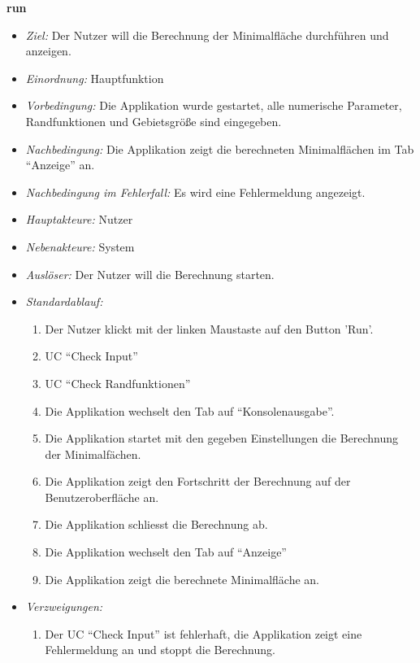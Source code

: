 \textbf{run}
  \begin{itemize}
  \item \textit{Ziel:} Der Nutzer will die Berechnung der Minimalfl\"ache durchf\"uhren und anzeigen.
  \item \textit{Einordnung:} Hauptfunktion
  \item \textit{Vorbedingung:} Die Applikation wurde gestartet, alle numerische Parameter, Randfunktionen und Gebietsgr\"o\ss e sind eingegeben.
  \item \textit{Nachbedingung:} Die Applikation zeigt die berechneten Minimalfl\"achen im Tab "`Anzeige"' an.
    \item \textit{Nachbedingung im Fehlerfall:} Es wird eine Fehlermeldung angezeigt.
  \item \textit{Hauptakteure:} Nutzer
  \item \textit{Nebenakteure:} System
  \item \textit{Ausl\"oser:} Der Nutzer will die Berechnung starten.
    \item \textit{Standardablauf:}
    \begin{enumerate}
    \item Der Nutzer klickt mit der linken Maustaste auf den Button 'Run'.
    \item UC "`Check Input"'
    \item UC "`Check Randfunktionen"'
    \item Die Applikation wechselt den Tab auf "`Konsolenausgabe"'.
    \item Die Applikation startet mit den gegeben Einstellungen die Berechnung der Minimalf\"achen.
    \item Die Applikation zeigt den Fortschritt der Berechnung auf der Benutzeroberfl\"ache an.
    \item Die Applikation schliesst die Berechnung ab.
    \item Die Applikation wechselt den Tab auf "`Anzeige"'
    \item Die Applikation zeigt die berechnete Minimalfl\"ache an.
  \end{enumerate}
  \item \textit{Verzweigungen:}
      \begin{enumerate}[label=(2a\arabic*)]
  \item Der UC "`Check Input"' ist fehlerhaft, die Applikation zeigt eine Fehlermeldung an und stoppt die Berechnung.
      \end{enumerate}
    \begin{enumerate}[label=(3a\arabic*)]

\end{enumerate}
\end{itemize}
